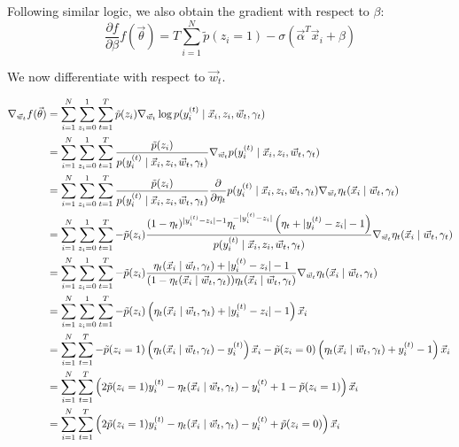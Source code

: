         Following similar logic, we also obtain the gradient with respect to $\beta$:
        \[
            \frac{\partial f}{\partial \beta} f(\vec \theta) = T \sum_{i = 1}^N \tilde p(z_i = 1) - \sigma(\vec \alpha^T \vec x_i + \beta)
        \]

        We now differentiate with respect to $\vec w_t$.

        \begin{align*}
            \nabla_{\vec w_t} f(\vec \theta) &= \sum_{i = 1}^N \sum_{z_i = 0}^1 \sum_{t = 1}^T \tilde p(z_i) \nabla_{\vec w_t} \log p(y_i^{(t)}\mid \vec x_i, z_i, \vec w_t, \gamma_t)\\
                &= \sum_{i = 1}^N \sum_{z_i = 0}^1 \sum_{t = 1}^T \frac{\tilde p(z_i)}{p(y_i^{(t)} \mid \vec x_i, z_i, \vec w_t, \gamma_t)} \nabla_{\vec w_t} p(y_i^{(t)}\mid \vec x_i, z_i, \vec w_t, \gamma_t)\\
                &= \sum_{i = 1}^N \sum_{z_i = 0}^1 \sum_{t = 1}^T \frac{\tilde p(z_i)}{p(y_i^{(t)} \mid \vec x_i, z_i, \vec w_t, \gamma_t)} \frac{\partial}{\partial \eta_t} p(y_i^{(t)}\mid \vec x_i, z_i, \vec w_t, \gamma_t) \nabla_{\vec w_t} \eta_t(\vec x_i \mid \vec w_t, \gamma_t)\\
                &= \sum_{i = 1}^N \sum_{z_i = 0}^1 \sum_{t = 1}^T - \tilde p(z_i) \frac{(1-\eta_t)^{|y_i^{(t)}-z_i|-1} \eta_t^{-|y_i^{(t)}-z_i|} \left(\eta_t+|y_i^{(t)}-z_i|-1\right)}{p(y_i^{(t)} \mid \vec x_i, z_i, \vec w_t, \gamma_t)} \nabla_{\vec w_t} \eta_t(\vec x_i \mid \vec w_t, \gamma_t)\\
                &= \sum_{i = 1}^N \sum_{z_i = 0}^1 \sum_{t = 1}^T - \tilde p(z_i) \frac{\eta_t(\vec x_i \mid \vec w_t, \gamma_t)+|y_i^{(t)}-z_i|-1}{(1-\eta_t(\vec x_i \mid \vec w_t, \gamma_t)) \eta_t(\vec x_i \mid \vec w_t, \gamma_t)} \nabla_{\vec w_t} \eta_t(\vec x_i \mid \vec w_t, \gamma_t)\\
                &= \sum_{i = 1}^N \sum_{z_i = 0}^1 \sum_{t = 1}^T - \tilde p(z_i) \left(\eta_t(\vec x_i \mid \vec w_t, \gamma_t)+|y_i^{(t)}-z_i|-1\right)\vec x_i\\
                &= \sum_{i = 1}^N \sum_{t = 1}^T - \tilde p(z_i = 1) \left(\eta_t(\vec x_i \mid \vec w_t, \gamma_t) - y_i^{(t)}\right)\vec x_i - \tilde p(z_i = 0) \left(\eta_t(\vec x_i \mid \vec w_t, \gamma_t) + y_i^{(t)} - 1\right)\vec x_i\\
                &= \sum_{i = 1}^N \sum_{t = 1}^T \left(
                    2 \tilde p(z_i = 1) y_i^{(t)}
                    - \eta_t(\vec x_i \mid \vec w_t, \gamma_t)
                    - y_i^{(t)}
                    + 1
                    - \tilde p(z_i = 1)
                \right)\vec x_i\\
                &= \sum_{i = 1}^N \sum_{t = 1}^T \left(
                    2 \tilde p(z_i = 1) y_i^{(t)}
                    - \eta_t(\vec x_i \mid \vec w_t, \gamma_t)
                    - y_i^{(t)}
                    + \tilde p(z_i = 0)
                \right)\vec x_i\\
        \end{align*}

